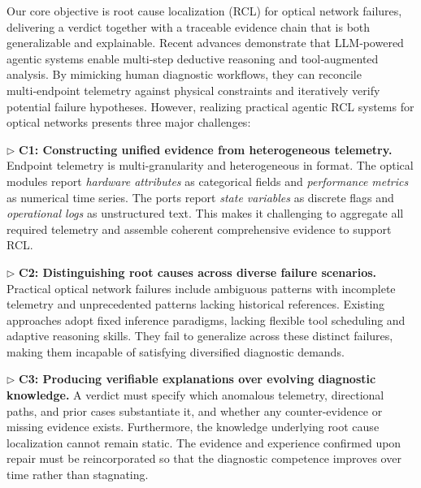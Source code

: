 Our core objective is root cause localization (RCL) for optical network failures, delivering a verdict together with a traceable evidence chain that is both generalizable and explainable.
Recent advances demonstrate that LLM‑powered agentic systems enable multi‑step deductive reasoning and tool‑augmented analysis.
By mimicking human diagnostic workflows, they can reconcile multi‑endpoint telemetry against physical constraints and iteratively verify potential failure hypotheses.
However, realizing practical agentic RCL systems for optical networks presents three major challenges:

\noindent $\rhd$ \textbf{C1: Constructing unified evidence from heterogeneous telemetry.} Endpoint telemetry is multi-granularity and heterogeneous in format. The optical modules report \textit{hardware attributes} as categorical fields and \textit{performance metrics} as numerical time series. The ports report \textit{state variables} as discrete flags and \textit{operational logs} as unstructured text. This makes it challenging to aggregate all required telemetry and assemble coherent comprehensive evidence to support RCL.

\noindent $\rhd$ \textbf{C2: Distinguishing root causes across diverse failure scenarios.}
Practical optical network failures include ambiguous patterns with incomplete telemetry and unprecedented patterns lacking historical references. Existing approaches adopt fixed inference paradigms, lacking flexible tool scheduling and adaptive reasoning skills. They fail to generalize across these distinct failures, making them incapable of satisfying diversified diagnostic demands.

\noindent $\rhd$ \textbf{C3: Producing verifiable explanations over evolving diagnostic knowledge.} A verdict must specify which anomalous telemetry, directional paths, and prior cases substantiate it, and whether any counter-evidence or missing evidence exists. Furthermore, the knowledge underlying root cause localization cannot remain static. The evidence and experience confirmed upon repair must be reincorporated so that the diagnostic competence improves over time rather than stagnating.

